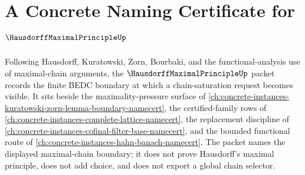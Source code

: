 \chapter{A Concrete Naming Certificate for $\HausdorffMaximalPrincipleUp$}
\label{ch:concrete-instances-hausdorff-maximal-principle-namecert}

Following Hausdorff, Kuratowski, Zorn, Bourbaki, and the functional-analysis use of maximal-chain arguments, the $\HausdorffMaximalPrincipleUp$ packet records the finite BEDC boundary at which a chain-saturation request becomes visible. It sits beside the maximality-pressure surface of \autoref{ch:concrete-instances-kuratowski-zorn-lemma-boundary-namecert}, the certified-family rows of \autoref{ch:concrete-instances-complete-lattice-namecert}, the replacement discipline of \autoref{ch:concrete-instances-cofinal-filter-base-namecert}, and the bounded functional route of \autoref{ch:concrete-instances-hahn-banach-namecert}. The packet names the displayed maximal-chain boundary; it does not prove Hausdorff's maximal principle, does not add choice, and does not export a global chain selector.

